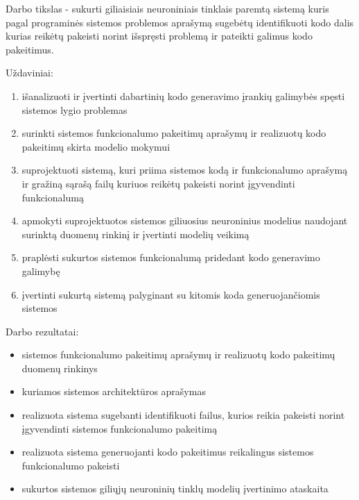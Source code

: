 \documentclass{VUMIFPSbakalaurinis}
\begin{document}
Darbo tikslas - sukurti giliaisiais neuroniniais tinklais paremtą sistemą kuris pagal programinės sistemos problemos aprašymą sugebėtų identifikuoti kodo dalis kurias reikėtų pakeisti norint išspręsti problemą ir pateikti galimus kodo pakeitimus.

Uždaviniai:
\begin{enumerate}
    \item išanalizuoti ir įvertinti dabartinių kodo generavimo įrankių galimybės spęsti sistemos lygio problemas
    \item surinkti sistemos funkcionalumo pakeitimų aprašymų ir realizuotų kodo pakeitimų skirta modelio mokymui
    \item suprojektuoti sistemą, kuri priima sistemos kodą ir funkcionalumo aprašymą ir gražiną sąrašą failų kuriuos reikėtų pakeisti norint įgyvendinti funkcionalumą
    \item apmokyti suprojektuotos sistemos giliuosius neuroninius modelius naudojant surinktą duomenų rinkinį ir įvertinti modelių veikimą
    \item praplėsti sukurtos sistemos funkcionalumą pridedant kodo generavimo galimybę
    \item įvertinti sukurtą sistemą palyginant su kitomis koda generuojančiomis sistemos
\end{enumerate}


Darbo rezultatai:
\begin{itemize}
    \item sistemos funkcionalumo pakeitimų aprašymų ir realizuotų kodo pakeitimų duomenų rinkinys
    \item kuriamos sistemos architektūros aprašymas
    \item realizuota sistema sugebanti identifikuoti failus, kurios reikia pakeisti norint įgyvendinti sistemos funkcionalumo pakeitimą
    \item realizuota sistema generuojanti kodo pakeitimus reikalingus sistemos funkcionalumo pakeisti
    \item sukurtos sistemos giliųjų neuroninių tinklų modelių įvertinimo ataskaita
\end{itemize}




\

\end{document}
